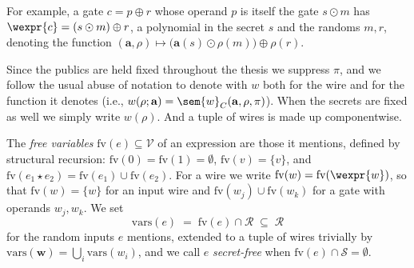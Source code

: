   For example, a gate $c = p \oplus r$ whose operand $p$ is itself the gate
  $s \odot m$ has $\wexpr{c} = (s \odot m) \oplus r$, a polynomial in the secret
  $s$ and the randoms $m, r$, denoting the function
  $(\mathbf{a}, \rho) \mapsto \big(\mathbf{a}(s) \odot \rho(m)\big) \oplus \rho(r)$.

  Since the publics are held fixed throughout the thesis we suppress $\pi$, and we
  follow the usual abuse of notation to denote with $w$ both for the wire and for
  the function it denotes (i.e., $w(\rho; \mathbf{a}) = \sem{w}_C(\mathbf{a}, \rho, \pi)$).
  When the secrets are fixed as well we simply write $w(\rho)$. And a tuple of wires is made up
  componentwise.

\begin{notation}
\label{not:fv-vars}
The \emph{free variables} $\mathrm{fv}(e) \subseteq \mathcal{V}$ of an expression
are those it mentions, defined by structural recursion:
$\mathrm{fv}(0) = \mathrm{fv}(1) = \emptyset$, $\mathrm{fv}(v) = \{v\}$, and
$\mathrm{fv}(e_1 \star e_2) = \mathrm{fv}(e_1) \cup \mathrm{fv}(e_2)$. For a wire
we write $\mathrm{fv}(w) = \mathrm{fv}(\wexpr{w})$, so that
$\mathrm{fv}(w) = \{w\}$ for an input wire and
$\mathrm{fv}(w_j) \cup \mathrm{fv}(w_k)$ for a gate with operands $w_j, w_k$. We
set
\[
  \mathrm{vars}(e) \;=\; \mathrm{fv}(e) \cap \mathcal{R} \;\subseteq\; \mathcal{R}
\]
for the random inputs $e$ mentions, extended to a tuple of wires trivially by
$\mathrm{vars}(\mathbf{w}) = \bigcup_i \mathrm{vars}(w_i)$, and we call $e$
\emph{secret-free} when $\mathrm{fv}(e) \cap \mathcal{S} = \emptyset$.
\end{notation}





